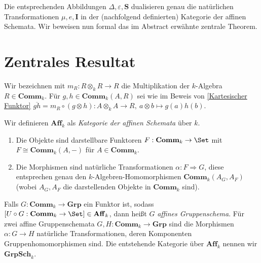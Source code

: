 \documentclass[11pt]{article}
\newcommand{\Comm}{\mathbf{Comm}}
\newcommand{\Aff}{\mathbf{Aff}}
\newcommand{\Grp}{\mathbf{Grp}}
\newcommand{\Sbold}{\mathbf{S}}
\newcommand{\Ibold}{\mathbf{I}}
\newcommand{\GrpSch}{\mathbf{GrpSch}}
\begin{document}
Die entsprechenden Abbildungen $\Delta, \varepsilon, \Sbold$ dualisieren genau die natürlichen Transformationen $\mu, e, \Ibold$ in der (nachfolgend definierten) Kategorie der affinen Schemata.
Wir beweisen nun formal das im Abstract erwähnte zentrale Theorem.
\newpage































\section{Zentrales Resultat}
 
Wir bezeichnen mit $m_R: R\otimes_k R\to R$ die Multiplikation der $k$-Algebra $R\in\Comm_k$. 
Für $g,h\in\Comm_k(A,R)$ sei wie im Beweis von \ref{Kartesischer Funktor}
$\overline{gh} = m_R\circ(g\otimes h): A\otimes_k A\to R,\ a\otimes b\mapsto g(a)h(b)$.
 
\begin{definition} \Theorem
    Wir definieren $\Aff_k$ als \emph{Kategorie der affinen Schemata} über $k$.
    \begin{enumerate}[label=(\roman*)] 
        \item Die Objekte sind darstellbare Funktoren $F: \Comm_k \to \Set$ mit $F\cong \Comm_k(A,-)$ für $A\in \Comm_k$.
        \item Die Morphismen sind natürliche Transformationen $\alpha: F\Rightarrow G$, diese entsprechen genau den $k$-Algebren-Homomorphismen $\Comm_k(A_G, A_F)$ 
        (wobei $A_G,A_F$ die darstellenden Objekte in $\Comm_k$ sind).
    \end{enumerate}
    Falls $G:\Comm_k \to \Grp$ ein Funktor ist, sodass $[U\circ G: \Comm_k \to \Set] \in \Aff_k$, dann heißt $G$ \emph{affines Gruppenschema}. 
    Für zwei affine Gruppenschemata $G,H: \Comm_k \to \Grp$ sind die Morphismen $\alpha: G\to H$ natürliche Transformationen, deren Komponenten Gruppenhomomorphismen sind.
    Die entstehende Kategorie über $\Aff_k$ nennen wir $\GrpSch_k$.
\end{definition}
\end{document}
